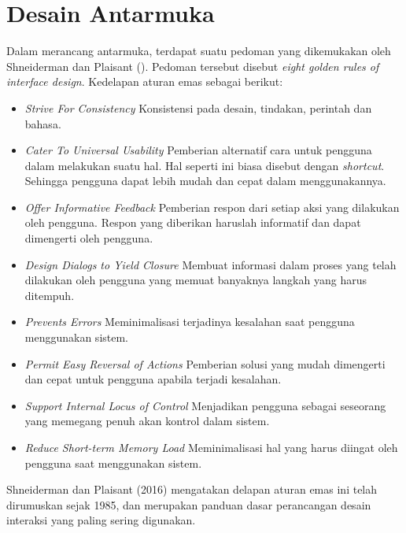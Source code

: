 	
\section{Desain Antarmuka}
Dalam merancang antarmuka, terdapat suatu pedoman yang dikemukakan oleh Shneiderman dan Plaisant (\citeyear{papper.shneiderman}).
Pedoman tersebut disebut \textit{eight golden rules of interface design}. Kedelapan aturan emas sebagai berikut:

\begin{itemize}
	\item \textit{Strive For Consistency}
	\subitem Konsistensi pada desain, tindakan, perintah dan bahasa.
	\item \textit{Cater To Universal Usability}
	\subitem Pemberian alternatif cara untuk pengguna dalam melakukan suatu hal. Hal seperti ini biasa disebut dengan \textit{shortcut}. Sehingga pengguna dapat lebih mudah dan cepat dalam menggunakannya.
	\item \textit{Offer Informative Feedback}
	\subitem Pemberian respon dari setiap aksi yang dilakukan oleh pengguna. Respon yang diberikan haruslah informatif dan dapat dimengerti oleh pengguna.
	\item \textit{Design Dialogs to Yield Closure}
	\subitem Membuat informasi dalam proses yang telah dilakukan oleh pengguna yang memuat banyaknya langkah yang harus ditempuh.
	\item \textit{Prevents Errors}
	\subitem Meminimalisasi terjadinya kesalahan saat pengguna menggunakan sistem.
	\item \textit{Permit Easy Reversal of Actions}
	\subitem Pemberian solusi yang mudah dimengerti dan cepat untuk pengguna apabila terjadi kesalahan.
	\item \textit{Support Internal Locus of Control}
	\subitem Menjadikan pengguna sebagai seseorang yang memegang penuh akan kontrol dalam sistem.
	\item \textit{Reduce Short-term Memory Load}
	\subitem Meminimalisasi hal yang harus diingat oleh pengguna saat menggunakan sistem.
\end{itemize}

Shneiderman dan Plaisant (2016) mengatakan delapan aturan emas ini telah dirumuskan sejak 1985, dan merupakan panduan dasar perancangan desain interaksi yang paling sering digunakan.
	
